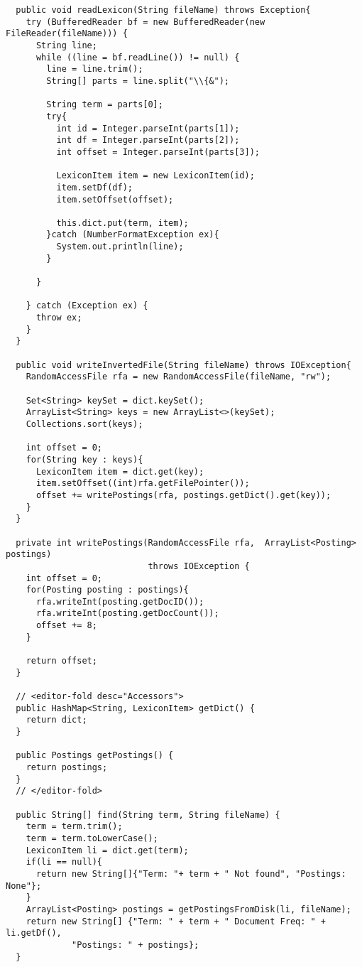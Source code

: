 \documentclass{article}
\begin{document}
\begin{verbatim}
  public void readLexicon(String fileName) throws Exception{
    try (BufferedReader bf = new BufferedReader(new FileReader(fileName))) {
      String line;
      while ((line = bf.readLine()) != null) {
        line = line.trim();
        String[] parts = line.split("\\{&");

        String term = parts[0];
        try{
          int id = Integer.parseInt(parts[1]);
          int df = Integer.parseInt(parts[2]);
          int offset = Integer.parseInt(parts[3]);

          LexiconItem item = new LexiconItem(id);
          item.setDf(df);
          item.setOffset(offset);

          this.dict.put(term, item);
        }catch (NumberFormatException ex){
          System.out.println(line);
        }

      }

    } catch (Exception ex) {
      throw ex;
    }
  }

  public void writeInvertedFile(String fileName) throws IOException{
    RandomAccessFile rfa = new RandomAccessFile(fileName, "rw");

    Set<String> keySet = dict.keySet();
    ArrayList<String> keys = new ArrayList<>(keySet);
    Collections.sort(keys);

    int offset = 0;
    for(String key : keys){
      LexiconItem item = dict.get(key);
      item.setOffset((int)rfa.getFilePointer());
      offset += writePostings(rfa, postings.getDict().get(key));
    }
  }

  private int writePostings(RandomAccessFile rfa,  ArrayList<Posting> postings)
                            throws IOException {
    int offset = 0;
    for(Posting posting : postings){
      rfa.writeInt(posting.getDocID());
      rfa.writeInt(posting.getDocCount());
      offset += 8;
    }

    return offset;
  }

  // <editor-fold desc="Accessors">
  public HashMap<String, LexiconItem> getDict() {
    return dict;
  }

  public Postings getPostings() {
    return postings;
  }
  // </editor-fold>

  public String[] find(String term, String fileName) {
    term = term.trim();
    term = term.toLowerCase();
    LexiconItem li = dict.get(term);
    if(li == null){
      return new String[]{"Term: "+ term + " Not found", "Postings: None"};
    }
    ArrayList<Posting> postings = getPostingsFromDisk(li, fileName);
    return new String[] {"Term: " + term + " Document Freq: " + li.getDf(),
             "Postings: " + postings};
  }


\end{verbatim}
\end{document}
